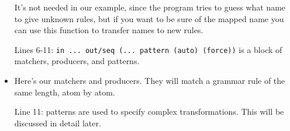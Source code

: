 \documentclass[a4paper]{article}
\begin{document}
\begin{itemize}
It's not needed in our example, since the program tries to guess what name to give unknown rules, but if you want to be sure of the mapped name you can use this function to transfer names to new rules.
\item[Lines 6-11:\hspace{0.5em}] 
\lstinline[language=transformer]{in ... out/seq (... pattern (auto) (force))} is a block of matchers, producers, and patterns.
\item[Lines 15 and 17:\hspace{0.5em}] 
Here's our matchers and producers. They will match a grammar rule of the same length, atom by atom. 
\item[Line 11:\hspace{0.5em}] 
patterns are used to specify complex transformations. This will be discussed in detail later.
\end{itemize}
\end{document}
